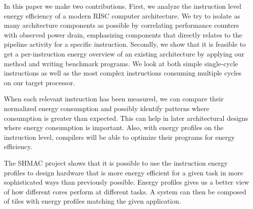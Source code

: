 In this paper we make two contributions. First, we analyze the instruction level
energy efficiency of a modern RISC computer architecture. We try to isolate as
many architecture components as possible by correlating performance counters
with observed power drain, emphasizing components that directly relates to the
pipeline activity for a specific instruction. Secondly, we show that it is
feasible to get a per-instruction energy overview of an existing architecture by
applying our method and writing benchmark programs. We look at both simple
single-cycle instructions as well as the most complex instructions consuming
multiple cycles on our target processor.

When each relevant instruction has been measured, we can compare their
normalized energy consumption and possibly identify patterns where consumption
is greater than expected. This can help in later architectural designs where
energy consumption is important. Also, with energy profiles on the instruction
level, compilers will be able to optimize their programs for energy efficiency.

The SHMAC project shows that it is possible to use the instruction energy
profiles to design hardware that is more energy efficient for a given task in
more sophisticated ways than previously possible. Energy profiles gives us a
better view of how different cores perform at different
tasks\cite{kumar2003single}. A system can then be composed of tiles with energy
profiles matching the given application.



